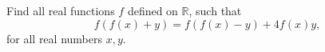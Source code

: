 Find all real functions $f$ defined on $ \mathbb R$, such that  \[f(f(x)+y) = f(f(x)-y)+4f(x)y ,\]for all real numbers $x,y$.